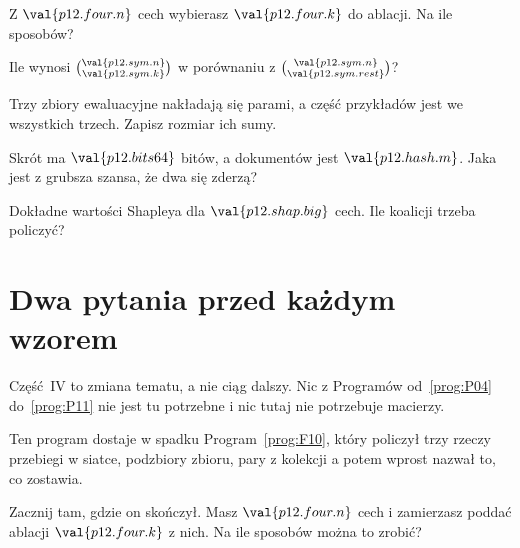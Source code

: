\begin{quiz}
\item Z $\val{p12.four.n}$ cech wybierasz $\val{p12.four.k}$ do ablacji. Na ile
  sposobów? 
\item Ile wynosi $\binom{\val{p12.sym.n}}{\val{p12.sym.k}}$ w porównaniu z
  $\binom{\val{p12.sym.n}}{\val{p12.sym.rest}}$? 
\item Trzy zbiory ewaluacyjne nakładają się parami, a część przykładów jest we
  wszystkich trzech. Zapisz rozmiar ich sumy. 
\item Skrót ma $\val{p12.bits64}$ bitów, a dokumentów jest
  $\val{p12.hash.m}$. Jaka jest z grubsza szansa, że dwa się zderzą?
\item Dokładne wartości Shapleya dla $\val{p12.shap.big}$ cech. Ile koalicji
  trzeba policzyć? 
\end{quiz}

\section{Dwa pytania przed każdym wzorem}
\label{sec:P12-two-questions}

\begin{fr}
Część~IV to zmiana tematu, a nie ciąg dalszy. Nic z Programów
od~\ref{prog:P04} do~\ref{prog:P11} nie jest tu potrzebne i nic tutaj nie
potrzebuje macierzy.

Ten program dostaje w spadku Program~\ref{prog:F10}, który policzył trzy
rzeczy \dash{} przebiegi w siatce, podzbiory zbioru, pary z kolekcji \dash{} a
potem wprost nazwał to, co zostawia.

Zacznij tam, gdzie on skończył. Masz $\val{p12.four.n}$ cech i zamierzasz
poddać ablacji $\val{p12.four.k}$ z nich. Na ile sposobów można to zrobić?
\dotline
\nextframe
\end{fr}

